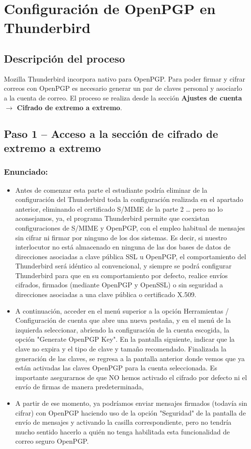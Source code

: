 \chapter{Configuración de OpenPGP en Thunderbird}

\section{Descripción del proceso}

Mozilla Thunderbird incorpora nativo para OpenPGP. Para poder firmar y cifrar correos con OpenPGP es necesario generar un par de claves personal y asociarlo a la cuenta de correo. El proceso se realiza desde la sección \textbf{Ajustes de cuenta $\rightarrow$ Cifrado de extremo a extremo}.

\section{Paso 1 -- Acceso a la sección de cifrado de extremo a extremo}
\subsection{Enunciado:}
\begin{itemize}[label=\textbullet]
    \item Antes de comenzar esta parte el estudiante podría eliminar de la configuración del
Thunderbird toda la configuración realizada en el apartado anterior, eliminando el certificado
S/MIME de la parte 2 … pero no lo aconsejamos, ya, el programa Thunderbird permite
que coexistan configuraciones de S/MIME y OpenPGP, con el empleo habitual de
mensajes sin cifrar ni firmar por ninguno de los dos sistemas. Es decir, si nuestro interlocutor
no está almacenado en ninguna de las dos bases de datos de direcciones asociadas a clave
pública SSL u OpenPGP, el comportamiento del Thunderbird será idéntico al convencional,
y siempre se podrá configurar Thunderbird para que en su comportamiento por defecto, realice
envíos cifrados, firmados (mediante OpenPGP y OpenSSL) o sin seguridad a direcciones
asociadas a una clave pública o certificado X.509.   
    \item A continuación, acceder en el menú superior a la opción Herramientas / Configuración de
cuenta que abre una nueva pestaña, y en el menú de la izquierda seleccionar, abriendo la
configuración de la cuenta escogida, la opción "Generate OpenPGP Key". En la pantalla
siguiente, indicar que la clave no expira y el tipo de clave y tamaño recomendado. Finalizada
la generación de las claves, se regresa a la pantalla anterior donde vemos que ya están
activadas las claves OpenPGP para la cuenta seleccionada. Es importante asegurarnos de que NO hemos activado el cifrado por defecto ni el envío de firmas de manera
predeterminada,
\item A partir de ese momento, ya podríamos enviar mensajes firmados (todavía sin cifrar) con
OpenPGP haciendo uso de la opción "Seguridad" de la pantalla de envío de mensajes y
activando la casilla correspondiente, pero no tendría mucho sentido hacerlo a quién no tenga
habilitada esta funcionalidad de correo seguro OpenPGP.
\end{itemize}

